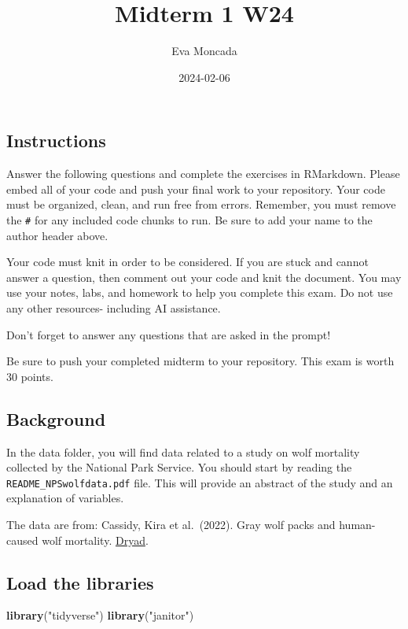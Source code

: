 \documentclass[
]{article}
\title{Midterm 1 W24}
\author{Eva Moncada}
\date{2024-02-06}
\newenvironment{Shaded}{\begin{snugshade}}{\end{snugshade}}
\newcommand{\FunctionTok}[1]{\textcolor[rgb]{0.13,0.29,0.53}{\textbf{#1}}}
\newcommand{\NormalTok}[1]{#1}
\newcommand{\StringTok}[1]{\textcolor[rgb]{0.31,0.60,0.02}{#1}}
\begin{document}
\maketitle

\hypertarget{instructions}{%
\subsection{Instructions}\label{instructions}}

Answer the following questions and complete the exercises in RMarkdown.
Please embed all of your code and push your final work to your
repository. Your code must be organized, clean, and run free from
errors. Remember, you must remove the \texttt{\#} for any included code
chunks to run. Be sure to add your name to the author header above.

Your code must knit in order to be considered. If you are stuck and
cannot answer a question, then comment out your code and knit the
document. You may use your notes, labs, and homework to help you
complete this exam. Do not use any other resources- including AI
assistance.

Don't forget to answer any questions that are asked in the prompt!

Be sure to push your completed midterm to your repository. This exam is
worth 30 points.

\hypertarget{background}{%
\subsection{Background}\label{background}}

In the data folder, you will find data related to a study on wolf
mortality collected by the National Park Service. You should start by
reading the \texttt{README\_NPSwolfdata.pdf} file. This will provide an
abstract of the study and an explanation of variables.

The data are from: Cassidy, Kira et al.~(2022). Gray wolf packs and
human-caused wolf mortality.
\href{https://doi.org/10.5061/dryad.mkkwh713f}{Dryad}.

\hypertarget{load-the-libraries}{%
\subsection{Load the libraries}\label{load-the-libraries}}

\begin{Shaded}
\begin{Highlighting}[]
\FunctionTok{library}\NormalTok{(}\StringTok{"tidyverse"}\NormalTok{)}
\FunctionTok{library}\NormalTok{(}\StringTok{"janitor"}\NormalTok{)}
\end{Highlighting}
\end{Shaded}
\end{document}
